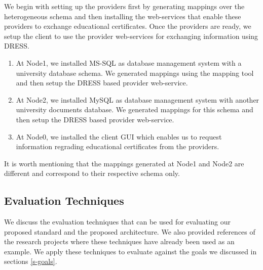 \documentclass[12pt,a4paper,oneside]{book}
\begin{document}
We begin with setting up the providers first by generating mappings over the heterogeneous schema and then installing the web-services that enable these providers to exchange educational certificates. Once the providers are ready, we setup the client to use the provider web-services for exchanging information using DRESS.

	\begin{enumerate}  

		\item At Node1, we installed MS-SQL as database management system with a university database schema. We generated mappings using the mapping tool and then setup the DRESS based provider web-service.

		\item At Node2, we installed MySQL as database management system with another university documents  database. We generated mappings for this schema and then setup the DRESS based provider web-service. 
	
		\item At Node0, we installed the client GUI which enables us to request information regrading educational certificates from the providers. 

	\end{enumerate}
	
It is worth mentioning that the mappings generated at Node1 and Node2 are different and correspond to their respective schema only. 

	\subsection{Evaluation Techniques}
	We discuss the evaluation techniques that can be used for evaluating our proposed standard and the proposed architecture. We also provided references of the research projects where these techniques have already been used as an example. We apply these techniques to evaluate against the goals we discussed in sections \ref{s-goals}. 
	
	
\end{document}

